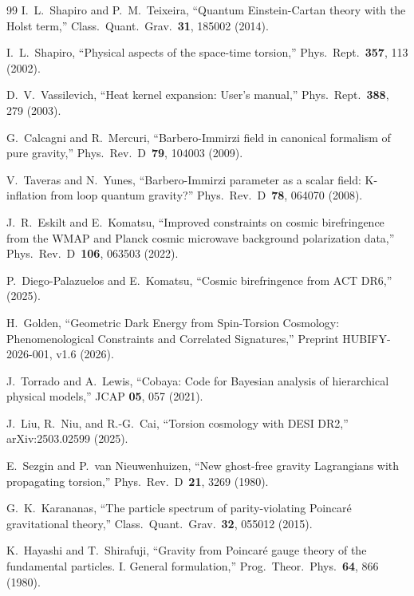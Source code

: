 \documentclass[aps,prd,twocolumn,superscriptaddress,showpacs,preprintnumbers,
  nofootinbib,longbibliography,floatfix]{revtex4-2}
\begin{document}
\begin{thebibliography}{99}
I.~L.~Shapiro and P.~M.~Teixeira,
``Quantum Einstein-Cartan theory with the Holst term,''
Class.\ Quant.\ Grav.\ \textbf{31}, 185002 (2014).

I.~L.~Shapiro,
``Physical aspects of the space-time torsion,''
Phys.\ Rept.\ \textbf{357}, 113 (2002).

D.~V.~Vassilevich,
``Heat kernel expansion: User's manual,''
Phys.\ Rept.\ \textbf{388}, 279 (2003).

G.~Calcagni and R.~Mercuri,
``Barbero-Immirzi field in canonical formalism of pure gravity,''
Phys.\ Rev.\ D~\textbf{79}, 104003 (2009).

V.~Taveras and N.~Yunes,
``Barbero-Immirzi parameter as a scalar field: K-inflation from loop
quantum gravity?''
Phys.\ Rev.\ D~\textbf{78}, 064070 (2008).

J.~R.~Eskilt and E.~Komatsu,
``Improved constraints on cosmic birefringence from the WMAP and Planck
cosmic microwave background polarization data,''
Phys.\ Rev.\ D~\textbf{106}, 063503 (2022).

P.~Diego-Palazuelos and E.~Komatsu,
``Cosmic birefringence from ACT DR6,''
(2025).

H.~Golden,
``Geometric Dark Energy from Spin-Torsion Cosmology:
Phenomenological Constraints and Correlated Signatures,''
Preprint HUBIFY-2026-001, v1.6 (2026).

J.~Torrado and A.~Lewis,
``Cobaya: Code for Bayesian analysis of hierarchical physical models,''
JCAP \textbf{05}, 057 (2021).

J.~Liu, R.~Niu, and R.-G.~Cai,
``Torsion cosmology with DESI DR2,''
arXiv:2503.02599 (2025).

E.~Sezgin and P.~van Nieuwenhuizen,
``New ghost-free gravity Lagrangians with propagating torsion,''
Phys.\ Rev.\ D~\textbf{21}, 3269 (1980).

G.~K.~Karananas,
``The particle spectrum of parity-violating Poincar\'e gravitational
theory,''
Class.\ Quant.\ Grav.\ \textbf{32}, 055012 (2015).

K.~Hayashi and T.~Shirafuji,
``Gravity from Poincar\'e gauge theory of the fundamental particles.
I. General formulation,''
Prog.\ Theor.\ Phys.\ \textbf{64}, 866 (1980).


\end{thebibliography}
\end{document}
